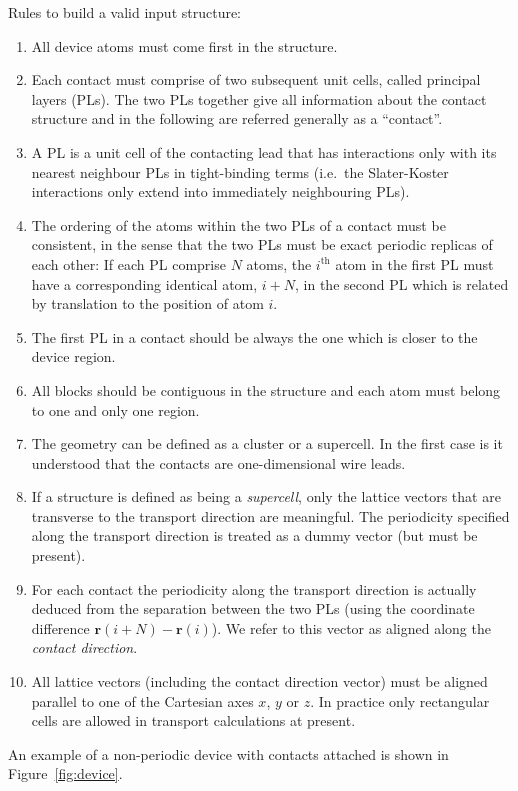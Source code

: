Rules to build a valid input structure:
\begin{enumerate}
\item \label{rule1} All device atoms must come first in the structure.
\item \label{rule2} Each contact must comprise of two subsequent unit cells,
  called principal layers (PLs). The two PLs together give all information about
  the contact structure and in the following are referred generally as a
  ``contact''.
\item \label{rule3} A PL is a unit cell of the contacting lead that has
  interactions only with its nearest neighbour PLs in tight-binding terms
  (i.e.\ the Slater-Koster interactions only extend into immediately neighbouring
  PLs).
\item \label{rule4} The ordering of the atoms within the two PLs of a contact
  must be consistent, in the sense that the two PLs must be exact periodic
  replicas of each other: If each PL comprise $N$ atoms, the $i^\mathrm{th}$
  atom in the first PL must have a corresponding identical atom, $i+N$, in the
  second PL which is related by translation to the position of atom $i$.
\item \label{rule5} The first PL in a contact should be always the one which is
  closer to the device region.
\item \label{rule6} All blocks should be contiguous in the structure and each
  atom must belong to one and only one region.
\item \label{rule7} The geometry can be defined as a cluster or a supercell. In
  the first case is it understood that the contacts are one-dimensional wire
  leads.
\item \label{rule8} If a structure is defined as being a {\em supercell}, only
  the lattice vectors that are transverse to the transport direction are
  meaningful. The periodicity specified along the transport direction is treated
  as a dummy vector (but must be present).
\item \label{rule9} For each contact the periodicity along the transport
  direction is actually deduced from the separation between the two PLs (using
  the coordinate difference $\mathbf{r}(i+N)-\mathbf{r}(i)$). We refer to this
  vector as aligned along the {\em contact direction}.
\item \label{rule10} All lattice vectors (including the contact direction
  vector) must be aligned parallel to one of the Cartesian axes $x$, $y$ or
  $z$. In practice only rectangular cells are allowed in transport calculations
  at present.
\end{enumerate}
An example of a non-periodic device with contacts attached is shown in
Figure~\ref{fig:device}.

